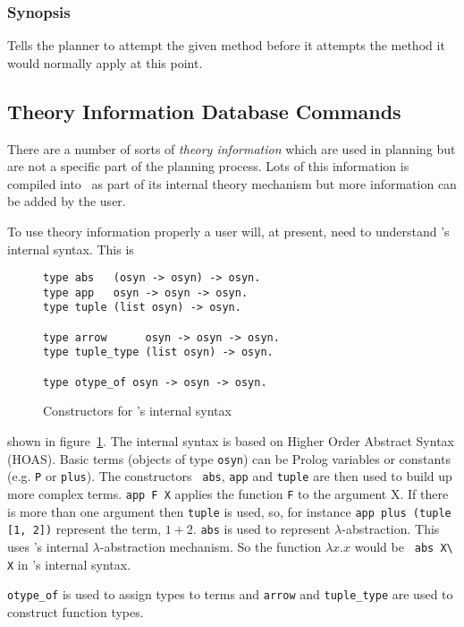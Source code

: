 \subsubsection*{Synopsis}
Tells the planner to attempt the given method before it attempts
the method it would normally apply at this point.  


\subsection{Theory Information Database Commands}
There are a number of sorts of {\em theory information} which are used in planning but are not a specific part
of the planning process.  Lots of this information is compiled into
\lclam\ as part of its internal theory mechanism but more information
can be added by the user.

To use theory information properly a user will, at present, need to
understand \lclam's internal syntax.  This is 
\begin{figure}[htb]
\begin{verbatim}
type abs   (osyn -> osyn) -> osyn.
type app   osyn -> osyn -> osyn.
type tuple (list osyn) -> osyn.

type arrow      osyn -> osyn -> osyn.
type tuple_type (list osyn) -> osyn.

type otype_of osyn -> osyn -> osyn.
\end{verbatim}
\caption{Constructors for \lclam's internal syntax}
\label{fig:syntax}
\end{figure}
shown in figure~\ref{fig:syntax}.  The internal syntax is based on
Higher Order Abstract 
Syntax (HOAS).  Basic
terms (objects of type {\tt osyn}) can be Prolog variables 
or constants (e.g. {\tt P} or {\tt plus}).  The constructors {\tt
  abs}, {\tt app} and {\tt tuple}
are then used to build up more complex terms.  {\tt app F X}
applies
the function {\tt F} to the argument {X}.  If there is more than one
argument then {\tt tuple} is used, so, for instance 
{\tt app plus (tuple [1, 2])} represent the term, $1 + 2$.  {\tt abs}
is used to represent
$\lambda$-abstraction.  This uses
\lprolog's internal $\lambda$-abstraction mechanism.  So the function
$\lambda x. x$ would be {\verb+ abs X\ X+} in \lclam's internal
syntax.

{\tt otype\_of} is used to assign types to terms and
{\tt arrow} and {\tt tuple\_type} are
used to construct function types.


